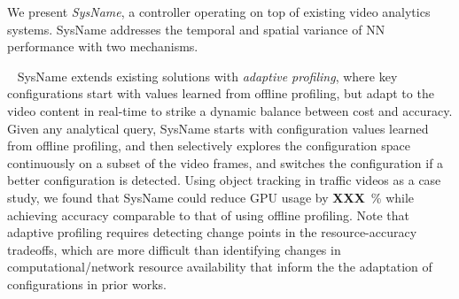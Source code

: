 \documentclass[letterpaper,twocolumn]{hotnets17}
\newcounter{note}[section]
\newcommand{\fillme}{{\bf XXX}~}
\newcommand{\mypara}[1]{\smallskip\noindent{\bf {#1}:}~}
\newcommand{\jc}[1]{{\footnotesize\color{blue}{[JC: #1]}}}
\newcommand{\name}{{SysName}\xspace}
\begin{document}
{%

We present {\em \name}, a controller operating on top of existing video 
analytics systems. 
\name addresses the temporal and spatial variance of NN performance
with two mechanisms.

\mypara{Adaptive profiling} 
\name extends
existing solutions with 
{\em adaptive profiling}, 
where key configurations start with values learned from offline profiling, 
but adapt to the video content in real-time to 
strike a dynamic balance between cost and accuracy.
Given any analytical query, 
\name starts with configuration values learned from 
offline profiling, and then selectively explores the configuration space
continuously on a subset 
of the video frames, and switches the configuration if a better
configuration is detected.
Using object tracking in traffic videos as a case study, we found that 
\name could reduce GPU usage by \fillme\% while 
achieving accuracy comparable to that of using offline profiling.
Note that adaptive profiling requires detecting
change points in the resource-accuracy tradeoffs, which are more 
difficult than identifying changes in 
computational/network resource availability that inform the 
the adaptation of configurations in prior works.




}
\end{document}
